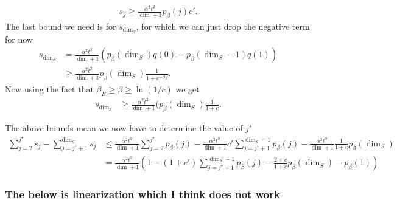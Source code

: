 \documentclass{article}
\newcommand{\parens}[1]{\left( #1 \right)}
\begin{document}
\begin{align}
    s_j \ge \frac{\alpha^2 t^2}{\dim + 1} p_{\beta}(j) c'.
\end{align}
The last bound we need is for $s_{\dim_S}$, for which we can just drop the negative term for now
\begin{align}
    s_{\dim_S} &= \frac{\alpha^2 t^2}{\dim + 1} (p_{\beta}(\dim_S) q(0) - p_{\beta}(\dim_S - 1) q(1)) \\
    &\ge \frac{\alpha^2 t^2}{\dim + 1} p_{\beta}(\dim_S) \frac{1}{1 + e^{-\beta_E}}.
\end{align}
Now using the fact that $\beta_E \ge \beta \ge \ln (1/ c)$ we get 
\begin{align}
    s_{\dim_S} &\ge \frac{\alpha^2 t^2}{\dim + 1} (p_{\beta}(\dim_S) \frac{1}{1 + c}.
\end{align}

The above bounds mean we now have to determine the value of $j^{\star}$
\begin{align}
    \sum_{j = 2}^{j^\star} s_j - \sum_{j=j^{\star} + 1}^{\dim_S} s_j &\le \frac{\alpha^2 t^2}{\dim + 1} \sum_{j = 2}^{j^\star} p_{\beta}(j) - \frac{\alpha^2 t^2}{\dim + 1} c' \sum_{j=j^{\star} + 1}^{\dim_S  -1} p_{\beta}(j) - \frac{\alpha^2 t^2}{\dim + 1} \frac{1}{1 + c} p_{\beta}(\dim_S) \\
    &= \frac{\alpha^2 t^2}{\dim + 1} \parens{1 - (1 + c')\sum_{j=j^{\star} + 1}^{\dim_S  -1} p_{\beta}(j) - \frac{2 + c}{1 + c} p_{\beta}(\dim_S) - p_{\beta}(1) }
\end{align}

\subsubsection{The below is linearization which I think does not work}
\end{document}
